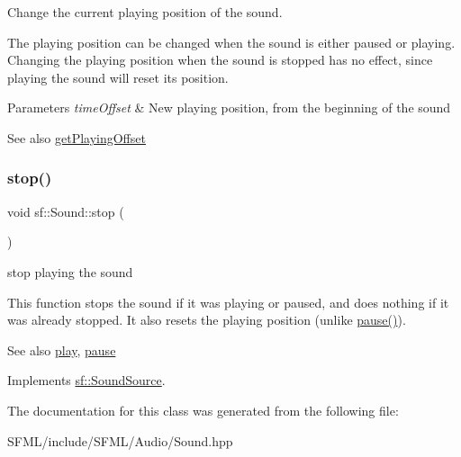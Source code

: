 Change the current playing position of the sound. 

The playing position can be changed when the sound is either paused or playing. Changing the playing position when the sound is stopped has no effect, since playing the sound will reset its position.


\begin{DoxyParams}{Parameters}
{\em time\+Offset} & New playing position, from the beginning of the sound\\
\hline
\end{DoxyParams}
\begin{DoxySeeAlso}{See also}
\mbox{\hyperlink{classsf_1_1_sound_a559bc3aea581107bcb380fdbe523aa08}{get\+Playing\+Offset}} \begin{DoxyVerb}\end{DoxyVerb}
 
\end{DoxySeeAlso}
\mbox{\label{classsf_1_1_sound_aa9c91c34f7c6d344d5ee9b997511f754}} 
\subsubsection{\texorpdfstring{stop()}{stop()}}
{\footnotesize\ttfamily void sf\+::\+Sound\+::stop (\begin{DoxyParamCaption}{ }\end{DoxyParamCaption})\hspace{0.3cm}{\ttfamily [virtual]}}



stop playing the sound 

This function stops the sound if it was playing or paused, and does nothing if it was already stopped. It also resets the playing position (unlike \mbox{\hyperlink{classsf_1_1_sound_a5eeb25815bfa8cdc4a6cc000b7b19ad5}{pause()}}).

\begin{DoxySeeAlso}{See also}
\mbox{\hyperlink{classsf_1_1_sound_a2953ffe632536e72e696fd880ced2532}{play}}, \mbox{\hyperlink{classsf_1_1_sound_a5eeb25815bfa8cdc4a6cc000b7b19ad5}{pause}} \begin{DoxyVerb}\end{DoxyVerb}
 
\end{DoxySeeAlso}


Implements \mbox{\hyperlink{classsf_1_1_sound_source_a06501a25b12376befcc7ee1ed4865fda}{sf\+::\+Sound\+Source}}.



The documentation for this class was generated from the following file\+:\begin{DoxyCompactItemize}
\item 
S\+F\+M\+L/include/\+S\+F\+M\+L/\+Audio/Sound.\+hpp\end{DoxyCompactItemize}

